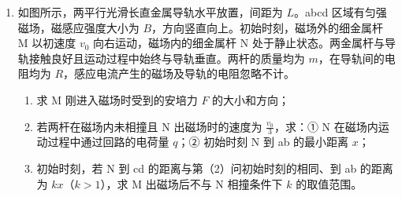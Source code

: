 \documentclass[\gkver]{gaokaozhenti}
\begin{document}
\begin{enumerate}
{$-mgR + qE \cdot \sqrt{2}R = \frac{1}{2}mv_{O}^{2} - \frac{1}{2}mv_{B}^{2}$

解得 $v_{O} = \sqrt{3gR}$

（3）小球运动至 O 点时速度竖直向上，受电场力和重力作用，将电场力分解到 x 轴和 y 轴，则 x 轴方向有

$qE\cos45^{\circ}=ma_{x}$

竖直方向有

$qE\sin45^{\circ}-mg=ma_{y}$

解得 $a_{x}=g,\quad a_{y}=0$

说明小球从 O 点开始以后的运动为 x 轴方向做初速度为零的匀加速直线运动，y 轴方向做匀速直线运动，即做类平抛运动，则有

$x=\frac{1}{2}gt^{2},\quad y=v_{O}t$

联立解得小球过 O 点后运动的轨迹方程 $y^{2}=6Rx$
}

\item
如图所示，两平行光滑长直金属导轨水平放置，间距为 $L$。abcd 区域有匀强磁场，磁感应强度大小为 $B$，方向竖直向上。初始时刻，磁场外的细金属杆 M 以初速度 $v_{0}$ 向右运动，磁场内的细金属杆 N 处于静止状态。两金属杆与导轨接触良好且运动过程中始终与导轨垂直。两杆的质量均为 $m$，在导轨间的电阻均为 $R$，感应电流产生的磁场及导轨的电阻忽略不计。

\begin{enumerate}
	\item
	求 M 刚进入磁场时受到的安培力 $F$ 的大小和方向；
	\item
	若两杆在磁场内未相撞且 N 出磁场时的速度为 $\frac{v_{0}}{3}$，求：① N 在磁场内运动过程中通过回路的电荷量 $q$；② 初始时刻 N 到 ab 的最小距离 $x$；
	\item
	初始时刻，若 N 到 cd 的距离与第（2）问初始时刻的相同、到 ab 的距离为 $kx$（$k > 1$），求 M 出磁场后不与 N 相撞条件下 $k$ 的取值范围。
\end{enumerate}

\onepicture[align=right, w=8.20cm]{}

\end{enumerate}
\end{document}
